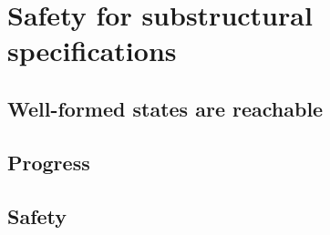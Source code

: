 \chapter{Safety for substructural specifications}
\label{chapter-safety}

\section{Well-formed states are reachable}
\label{sec:well-formed-reachable}

\section{Progress}

\section{Safety}